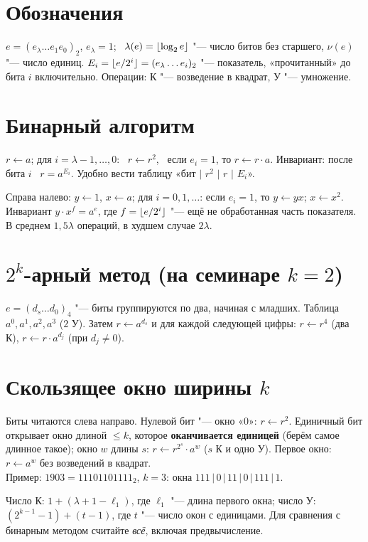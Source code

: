 \documentclass{ca-handout}
\begin{document}
\makehandouttitle

\section{Обозначения}
$e = (e_\lambda \dots e_1 e_0)_2$, $e_\lambda = 1$; \ $\lambda(e) = \lfloor\log_2 e\rfloor$ "--- число
битов без старшего, $\nu(e)$ "--- число единиц. $E_i = \lfloor e/2^i\rfloor = (e_\lambda \dots e_i)_2$ "---
показатель, «прочитанный» до бита $i$ включительно. Операции: К "--- возведение в квадрат,
У "--- умножение.

\section{Бинарный алгоритм}
\begin{reminder}[title={Слева направо: $\lambda(e)$ К и $\nu(e) - 1$ У}]
$r \gets a$; для $i = \lambda - 1, \dots, 0$: \ $r \gets r^2$, \ если $e_i = 1$, то $r \gets r \cdot a$.
Инвариант: после бита $i$ \ $r = a^{E_i}$. Удобно вести таблицу «бит $\mid$ $r^2$ $\mid$ $r$
$\mid$ $E_i$».
\end{reminder}
Справа налево: $y \gets 1$, $x \gets a$; для $i = 0, 1, \dots$: если $e_i = 1$, то $y \gets yx$;
$x \gets x^2$. Инвариант $y \cdot x^{f} = a^e$, где $f = \lfloor e / 2^{i}\rfloor$ "--- ещё не
обработанная часть показателя. В среднем $1{,}5\lambda$ операций, в худшем случае $2\lambda$.

\section{$2^k$-арный метод (на семинаре $k = 2$)}
$e = (d_s \dots d_0)_{4}$ "--- биты группируются по два, начиная с младших. Таблица
$a^0, a^1, a^2, a^3$ ($2$ У). Затем $r \gets a^{d_s}$ и для каждой следующей цифры:
$r \gets r^4$ (два К), $r \gets r \cdot a^{d_j}$ (при $d_j \ne 0$).

\section{Скользящее окно ширины $k$}
\begin{reminder}[title={Предвычисление: $a^2$, $a^3 = a \cdot a^2$, $a^5 = a^3 \cdot a^2$, \dots, $a^{2^k - 1}$
($1$ К и $2^{k-1} - 1$ У)}]
Биты читаются слева направо. Нулевой бит "--- окно «$0$»: $r \gets r^2$. Единичный бит открывает
окно длиной $\le k$, которое \textbf{оканчивается единицей} (берём самое длинное такое);
окно $w$ длины $s$: $r \gets r^{2^s} \cdot a^{w}$ ($s$ К и одно У). Первое окно: $r \gets a^{w}$
без возведений в квадрат.\\
Пример: $1903 = 11101101111_2$, $k = 3$: окна $111\,|\,0\,|\,11\,|\,0\,|\,111\,|\,1$.
\end{reminder}
Число К: $1 + (\lambda + 1 - \ell_1)$, где $\ell_1$ "--- длина первого окна; число У:
$(2^{k-1} - 1) + (t - 1)$, где $t$ "--- число окон с единицами. Для сравнения с бинарным методом
считайте \emph{всё}, включая предвычисление.
\end{document}
